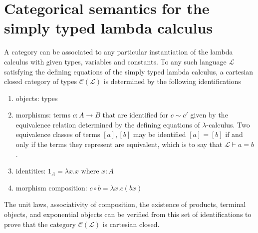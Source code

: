 \section*{Categorical semantics for the simply typed lambda calculus}
A category can be associated to any particular instantiation of the lambda calculus with given types, variables and constants. To any such language $\mathcal{L}$ satisfying the defining equations of the simply typed lambda calculus, a cartesian closed category of types $\mathcal{C}(\mathcal{L})$ is determined by the following identifications
\begin{enumerate}
\item{objects: } types
\item{morphisms: } terms $c \colon A \rightarrow B$ that are identified for $c \sim c'$ given by the equivalence relation determined by the defining equations of $\lambda$-calculus. Two equivalence classes of terms $[a], [b]$ may be identified $[a] = [b]$ if and only if the terms they represent are equivalent, which is to say that  $\mathcal{L} \vdash a = b$.
\item{identities: } $1_A = \lambda x.x$ where $x \colon A$
\item{morphism composition: } $c \circ b = \lambda x.c(bx)$
\end{enumerate}
The unit laws, associativity of composition, the existence of products, terminal objects, and exponential objects can be verified from this set of identifications to prove that the category $\mathcal{C}(\mathcal{L})$ is cartesian closed.

